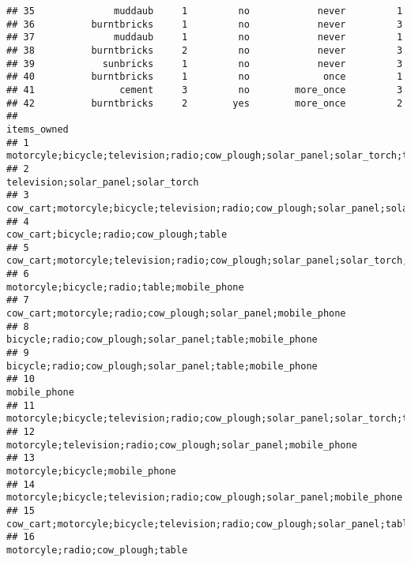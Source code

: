\documentclass[
]{article}
\begin{document}
\begin{verbatim}
## 35              muddaub     1         no            never         1
## 36          burntbricks     1         no            never         3
## 37              muddaub     1         no            never         1
## 38          burntbricks     2         no            never         3
## 39            sunbricks     1         no            never         3
## 40          burntbricks     1         no             once         1
## 41               cement     3         no        more_once         3
## 42          burntbricks     2        yes        more_once         2
##                                                                                                              items_owned
## 1                                     motorcyle;bicycle;television;radio;cow_plough;solar_panel;solar_torch;table;fridge
## 2                                                                                     television;solar_panel;solar_torch
## 3                                   cow_cart;motorcyle;bicycle;television;radio;cow_plough;solar_panel;solar_torch;table
## 4                                                                                cow_cart;bicycle;radio;cow_plough;table
## 5                     cow_cart;motorcyle;television;radio;cow_plough;solar_panel;solar_torch;table;sofa_set;mobile_phone
## 6                                                                             motorcyle;bicycle;radio;table;mobile_phone
## 7                                                           cow_cart;motorcyle;radio;cow_plough;solar_panel;mobile_phone
## 8                                                                bicycle;radio;cow_plough;solar_panel;table;mobile_phone
## 9                                                                bicycle;radio;cow_plough;solar_panel;table;mobile_phone
## 10                                                                                                          mobile_phone
## 11                              motorcyle;bicycle;television;radio;cow_plough;solar_panel;solar_torch;table;mobile_phone
## 12                                                        motorcyle;television;radio;cow_plough;solar_panel;mobile_phone
## 13                                                                                        motorcyle;bicycle;mobile_phone
## 14                                                motorcyle;bicycle;television;radio;cow_plough;solar_panel;mobile_phone
## 15                                 cow_cart;motorcyle;bicycle;television;radio;cow_plough;solar_panel;table;mobile_phone
## 16                                                                                      motorcyle;radio;cow_plough;table

\end{verbatim}
\end{document}
